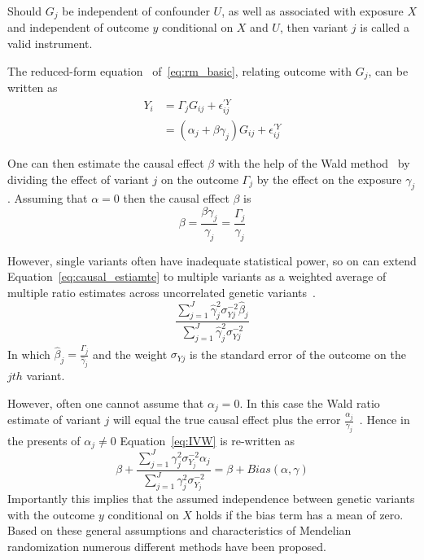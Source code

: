 Should $G_j$ be independent of confounder $U$,
as well as associated with exposure $X$ and independent of outcome $y$ conditional on $X$ and $U$, then variant $j$ is called a valid instrument.

The reduced-form equation~\cite{Bowden2015} of~\ref{eq:rm_basic}, relating outcome with $G_j$, can be written as
\begin{equation}
	\begin{split}
		Y_i &= \Gamma_j G_{ij} + \epsilon_{ij}^{'Y} \\
		&= (\alpha_j + \beta\gamma_j)G_{ij} + \epsilon_{ij}^{'Y}
	\end{split}
\end{equation}

One can then estimate the causal effect $\beta$ with the help of the Wald method~\cite{Wald1940}
by dividing the effect of variant $j$ on the outcome $\Gamma_j$ by the effect on the exposure $\gamma_j$.
Assuming that $\alpha=0$ then the causal effect $\beta$ is
\begin{equation} \label{eq:causal_estiamte}
	\beta = \frac{\beta\gamma_j}{\gamma_j}= \frac{\Gamma_j}{\gamma_j}
\end{equation}

However, single variants often have inadequate statistical power, so on can extend Equation~\ref{eq:causal_estiamte} to multiple variants as a weighted average of multiple ratio estimates across uncorrelated genetic variants~\cite{Bowden2015}.
\begin{equation} \label{eq:IVW}
  \frac{\sum^J_{j=1} \hat{\gamma}_j^2\sigma_{Yj}^{-2} \hat{\beta}_j}
  {\sum^J_{j=1} \hat{\gamma}_j^2\sigma_{Yj}^{-2}}
\end{equation}
In which $\hat{\beta}_j = \frac{\hat{\Gamma}_j}{\hat{\gamma}_j}$ and the weight $\sigma_{Yj}$ is the standard error of the outcome on the $jth$ variant.

However, often one cannot assume that $\alpha_j = 0$.
In this case the Wald ratio estimate of variant $j$ will equal the true causal effect plus the error $\frac{\alpha_j}{\gamma_j}$~\cite{Bowden2015}. 
Hence in the presents of $\alpha_j \neq 0$ Equation~\ref{eq:IVW} is re-written as
\begin{equation} \label{eq:TSLSbias}
  \beta + \frac{\sum^J_{j=1} \gamma_j^2\sigma_{Y_j}^{-2} \alpha_j}
  {\sum^J_{j=1} \gamma_j^2\sigma_{Y_j}^{-2}} = \beta + Bias(\alpha, \gamma)
\end{equation}
Importantly this implies that the assumed independence between genetic variants with the outcome $y$ conditional on $X$ holds if the bias term has a mean of zero.
Based on these general assumptions and characteristics of Mendelian randomization numerous different methods have been proposed.

